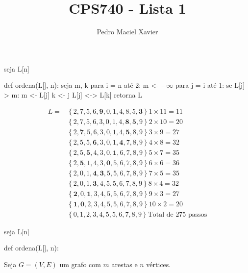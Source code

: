 \documentclass{homework}
\title{CPS740 - Lista 1}
\author{Pedro Maciel Xavier}
\begin{document}
	\maketitle
	
	\quest
	
	
	\subsubquest[Algoritmo]
	
	\begin{algor}
seja L[n]

def ordena(L[], n):
	seja m, k
	para i = n até 2:
		m <- $-\infty$
		para j = i até 1:
			se L[j] > m:
				m <- L[j]
				k <- j
		L[j] <-> L[k]
	retorna L
	\end{algor}

	\begin{align*}
	L = &\left\{2,7,5,6,\mathbf{9},0,1,4,8,5,\mathbf{3}\right\} 1 \times 11 = 11\\
	&\left\{2,7,5,6,3,0,1,4,\mathbf{8},\mathbf{5},9\right\} 2 \times 10 = 20\\
	&\left\{2,\mathbf{7},5,6,3,0,1,4,\mathbf{5},8,9\right\} 3 \times  9 = 27\\
	&\left\{2,5,5,\mathbf{6},3,0,1,\mathbf{4},7,8,9\right\} 4 \times  8 = 32\\
	&\left\{2,5,\mathbf{5},4,3,0,\mathbf{1},6,7,8,9\right\} 5 \times  7 = 35\\
	&\left\{2,\mathbf{5},1,4,3,\mathbf{0},5,6,7,8,9\right\} 6 \times  6 = 36\\
	&\left\{2,0,1,\mathbf{4},\mathbf{3},5,5,6,7,8,9\right\} 7 \times  5 = 35\\
	&\left\{2,0,1,\mathbf{3},4,5,5,6,7,8,9\right\} 8 \times  4 = 32\\
	&\left\{\mathbf{2},0,\mathbf{1},3,4,5,5,6,7,8,9\right\} 9 \times  3 = 27\\
	&\left\{\mathbf{1},\mathbf{0},2,3,4,5,5,6,7,8,9\right\}10 \times  2 = 20\\
	&\left\{0,1,2,3,4,5,5,6,7,8,9\right\} \text{Total de $275$ passos}
	\end{align*}
	
	
	\subsubquest[Algoritmo]
	\begin{algor}
seja L[n]

def ordena(L[], n):
	
	\end{algor}

	\quest
	Seja $G = (V, E)$ um grafo com $m$ arestas e $n$ vértices.\\
	
\end{document}
